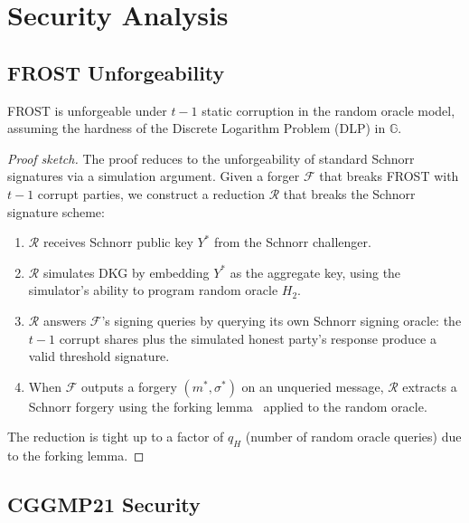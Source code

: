 \section{Security Analysis}

\label{sec:security}

\subsection{FROST Unforgeability}

\begin{theorem}
\label{thm:frost-uf}
FROST is unforgeable under $t{-}1$ static corruption in the random oracle model,
assuming the hardness of the Discrete Logarithm Problem (DLP) in $\mathbb{G}$.
\end{theorem}

\begin{proof}[Proof sketch]
The proof reduces to the unforgeability of standard Schnorr signatures via a
simulation argument. Given a forger $\mathcal{F}$ that breaks FROST with $t-1$
corrupt parties, we construct a reduction $\mathcal{R}$ that breaks the Schnorr
signature scheme:

\begin{enumerate}[nosep]
  \item $\mathcal{R}$ receives Schnorr public key $Y^*$ from the Schnorr challenger.
  \item $\mathcal{R}$ simulates DKG by embedding $Y^*$ as the aggregate key, using
    the simulator's ability to program random oracle $H_2$.
  \item $\mathcal{R}$ answers $\mathcal{F}$'s signing queries by querying its own
    Schnorr signing oracle: the $t-1$ corrupt shares plus the simulated honest
    party's response produce a valid threshold signature.
  \item When $\mathcal{F}$ outputs a forgery $(m^*, \sigma^*)$ on an unqueried
    message, $\mathcal{R}$ extracts a Schnorr forgery using the forking
    lemma~\cite{pointcheval1996} applied to the random oracle.
\end{enumerate}

The reduction is tight up to a factor of $q_H$ (number of random oracle queries) due
to the forking lemma.
\end{proof}

\subsection{CGGMP21 Security}

